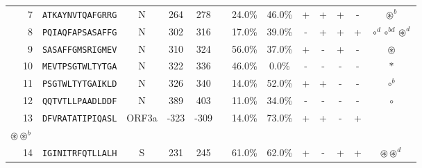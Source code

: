 \begin{tabular}{rcccccccccccc}
7  &  \texttt{ATKAYNVTQAFGRRG} &       N &    264 &   278 &                &                          24.0\% &                           46.0\% &          + &           + &          + &           - &                                                                                                       $ \circledast^b $ \\
8  &  \texttt{PQIAQFAPSASAFFG} &       N &    302 &   316 &                &                          17.0\% &                           39.0\% &          - &           + &          + &           + &                                                                                    $ \circ^d \circ^{bd} \circledast^d $ \\
9  &  \texttt{SASAFFGMSRIGMEV} &       N &    310 &   324 &                &                          56.0\% &                           37.0\% &          + &           - &          + &           - &                                                                                                         $ \circledast $ \\
10 &  \texttt{MEVTPSGTWLTYTGA} &       N &    322 &   336 &                &                          46.0\% &                            0.0\% &          - &           - &          - &           - &                                                                                                                $ \ast $ \\
11 &  \texttt{PSGTWLTYTGAIKLD} &       N &    326 &   340 &                &                          14.0\% &                           52.0\% &          + &           + &          - &           - &                                                                                                             $ \circ^b $ \\
12 &  \texttt{QQTVTLLPAADLDDF} &       N &    389 &   403 &                &                          11.0\% &                           34.0\% &          - &           - &          - &           - &                                                                                                               $ \circ $ \\
13 &  \texttt{DFVRATATIPIQASL} &   ORF3a &   -323 &  -309 &                &                          14.0\% &                           73.0\% &          + &           + &          - &           + &                                     \Centerstack{  $\circ \circ^b \circ^d \circ^{bd}$ \\  $\circledast \circledast^b$ } \\
14 &  \texttt{IGINITRFQTLLALH} &       S &    231 &   245 &                &                          61.0\% &                           62.0\% &          + &           - &          + &           + &                                                                                           $ \circledast \circledast^d $ \\

\end{tabular}

